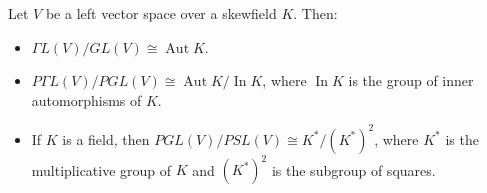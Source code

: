 Let $V$ be a left vector space over a skewfield $K$. Then:
\begin{itemize}
\item[(a)] $\Gamma L(V)/GL(V) \cong \operatorname{Aut} K$.
\item[(b)] $P\Gamma L(V)/PGL(V) \cong \operatorname{Aut} K / \operatorname{In} K$, where $\operatorname{In} K$ is the group of inner automorphisms of $K$.
\item[(c)] If $K$ is a field, then $PGL(V)/PSL(V) \cong K^*/(K^*)^2$, where $K^*$ is the multiplicative group of $K$ and $(K^*)^2$ is the subgroup of squares.
\end{itemize}
